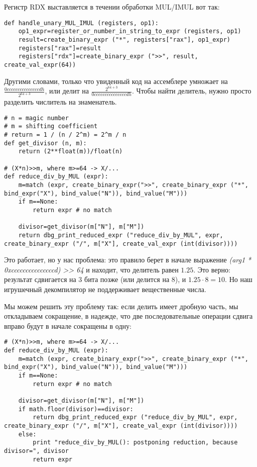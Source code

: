 Регистр RDX выставляется в течении обработки MUL/IMUL вот так:

\begin{lstlisting}
def handle_unary_MUL_IMUL (registers, op1):
    op1_expr=register_or_number_in_string_to_expr (registers, op1)
    result=create_binary_expr ("*", registers["rax"], op1_expr)
    registers["rax"]=result
    registers["rdx"]=create_binary_expr (">>", result, create_val_expr(64))
\end{lstlisting}

Другими словами, только что увиденный код на ассемблере умножает на {\Large $\frac{0cccccccccccccccdh}{2^{64+3}}$},
или делит на {\Large $\frac{2^{64+3}}{0cccccccccccccccdh}$}.
Чтобы найти делитель, нужно просто разделить числитель на знаменатель.

\begin{lstlisting}
# n = magic number
# m = shifting coefficient
# return = 1 / (n / 2^m) = 2^m / n
def get_divisor (n, m):
    return (2**float(m))/float(n)

# (X*n)>>m, where m>=64 -> X/...
def reduce_div_by_MUL (expr):
    m=match (expr, create_binary_expr(">>", create_binary_expr ("*", bind_expr("X"), bind_value("N")), bind_value("M")))
    if m==None:
        return expr # no match
    
    divisor=get_divisor(m["N"], m["M"])
    return dbg_print_reduced_expr ("reduce_div_by_MUL", expr, create_binary_expr ("/", m["X"], create_val_expr (int(divisor))))
\end{lstlisting}

Это работает, но у нас проблема: это правило берет в начале выражение \textit{(arg1 * 0xcccccccccccccccd) >> 64} и находит,
что делитель равен $1.25$.
Это верно: результат сдвигается на 3 бита позже (или делится на 8), и $1.25 \cdot 8 = 10$.
Но наш игрушечный декомпилятор не поддерживает вещественные числа.

Мы можем решить эту проблему так: если делить имеет дробную часть, мы откладываем сокращение, в надежде,
что две последовательные операции сдвига вправо будут в начале сокращены в одну:

\begin{lstlisting}
# (X*n)>>m, where m>=64 -> X/...
def reduce_div_by_MUL (expr):
    m=match (expr, create_binary_expr(">>", create_binary_expr ("*", bind_expr("X"), bind_value("N")), bind_value("M")))
    if m==None:
        return expr # no match
    
    divisor=get_divisor(m["N"], m["M"])
    if math.floor(divisor)==divisor:
        return dbg_print_reduced_expr ("reduce_div_by_MUL", expr, create_binary_expr ("/", m["X"], create_val_expr (int(divisor))))
    else:
        print "reduce_div_by_MUL(): postponing reduction, because divisor=", divisor
        return expr
\end{lstlisting}

